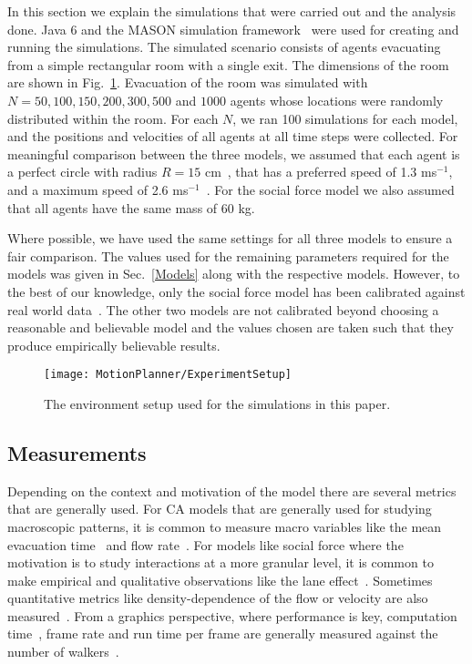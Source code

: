 In this section we explain the simulations that were carried out and the analysis done. Java 6 and the MASON simulation framework~\cite{Luke:2005wc} were used for creating and running the simulations. The simulated scenario consists of agents evacuating from a simple rectangular room with a single exit. The dimensions of the room are shown in Fig.~\ref{fig:experimentalSetup}. Evacuation of the room was simulated with $N = 50, 100, 150, 200, 300, 500$ and $1000$ agents whose locations were randomly distributed within the room. For each $N$, we ran 100 simulations for each model, and the positions and velocities of all agents at all time steps were collected. For meaningful comparison between the three models, we assumed that each agent is a perfect circle with radius $R = 15$ cm~\cite{Pan:2006vp}, that has a preferred speed of 1.3 ms$^{-1}$, and a maximum speed of 2.6 ms$^{-1}$~\cite{fruin1992designing}. For the social force model we also assumed that all agents have the same mass of 60 kg.

Where possible, we have used the same settings for all three models to ensure a fair comparison. The values used for the remaining parameters required for the models was given in Sec.~\ref{Models} along with the respective models. However, to the best of our knowledge, only the social force model has been calibrated against real world data~\cite{Bauer2011}. The other two models are not calibrated beyond choosing a reasonable and believable model and the values chosen are taken such that they produce empirically believable results.


\begin{figure}[!tbp]
\centering
\texttt{[image: MotionPlanner/ExperimentSetup]}
\caption{The environment setup used for the simulations in this paper.}
\label{fig:experimentalSetup}
\end{figure}

\subsection{Measurements}

Depending on the context and motivation of the model there are several metrics that are generally used. For CA models that are generally used for studying macroscopic patterns, it is common to measure macro variables like the mean evacuation time~\cite{Nagai:2004kl} and flow rate~\cite{Tajima:2001to}. For models like social force where the motivation is to study interactions at a more granular level, it is common to make empirical and qualitative observations like the lane effect~\cite{Helbing:1995ie}. Sometimes quantitative metrics like density-dependence of the flow or velocity are also measured~\cite{Seyfried2008}. From a graphics perspective, where performance is key, computation time~\cite{Ondrej:2010hv}, frame rate and run time per frame are generally measured against the number of walkers~\cite{vandenBerg:2008fu}.

